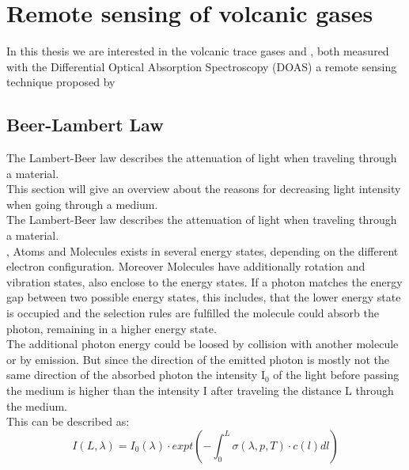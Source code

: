 \documentclass  [
  paper    = a4,
  BCOR     = 10mm,
  twoside,
  fontsize = 12pt,
  fleqn,
  toc      = bibnumbered,
  toc      = listofnumbered,
  numbers  = noendperiod,
  headings = normal,
  listof   = leveldown,
  version  = 3.03
]                                       {scrreprt}
\begin{document}
	\chapter{Remote sensing of volcanic gases}
	In this thesis we are interested in the volcanic trace gases  and , both measured with the Differential Optical Absorption Spectroscopy (DOAS) a remote sensing technique proposed by \cite{platt2008differential}\\
	

	\section*{Beer-Lambert Law}
	The Lambert-Beer law describes the attenuation of light when traveling through a material.\\
	This section will give an overview about the reasons for decreasing light intensity when going through a medium.\\
	The Lambert-Beer law describes the attenuation of light when traveling through a material.\\
                                                                                                                                                                                                                                                                                       ,
	Atoms and Molecules exists in several energy states, depending on the different electron configuration. Moreover Molecules have additionally rotation and vibration states, also enclose to the energy states. If a photon matches the energy gap between two possible energy states, this includes, that the lower energy state is occupied and the selection rules are fulfilled  the molecule could absorb the photon, remaining in a higher energy state.\\
	The additional photon energy could be loosed by collision with another molecule or by emission. But since the direction of the emitted photon is mostly not the same direction of the absorbed photon the intensity I$_{0}$ of the light before passing the medium is higher than the intensity I after traveling the distance L through the medium.\\
	This can be described as:\\ 
	\begin{equation}
	I\left(L,\lambda\right) = I_{0}\left(\lambda\right)\cdot expt\left(-\int^{L}_{0}\sigma\left(\lambda,p,T\right)\cdot c\left(l\right)dl\right)
	\end{equation}
\end{document}
